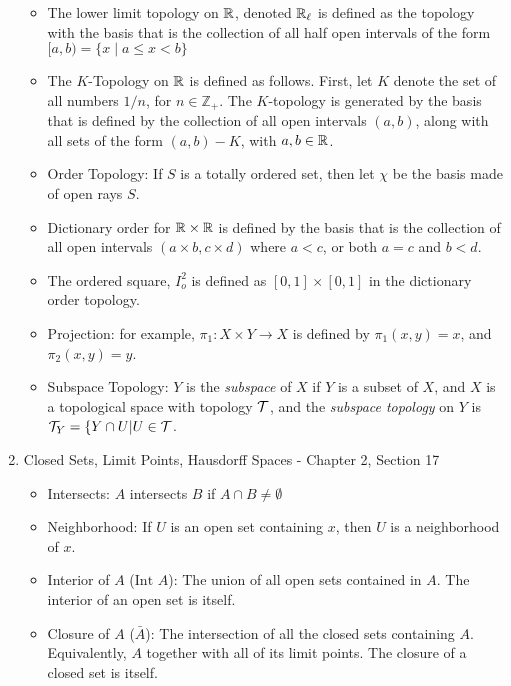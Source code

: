 \documentclass[12pt,letterpaper]{article}
\begin{document}
\begin{enumerate}
\begin{itemize}
    \item \label{dfn:lowerLimitTopology} The lower limit topology on $\mathbb{R}$, denoted $\mathbb{R}_\ell$ is defined as the topology with the basis that is the collection of all half open intervals of the form $[a,b) = \{ x\; |\; a\leq x < b \}$
    \item \label{dfn:KTopology} The $K$-Topology on $\mathbb{R}$ is defined as follows. First, let $K$ denote the set of all numbers $1/n$, for $n\in\mathbb{Z}_+$. The $K$-topology is generated by the basis that is defined by the collection of all open intervals $(a,b)$, along with all sets of the form $(a,b)-K$, with $a,b\in\mathbb{R}$.
    \item \label{dfn:orderTopology} Order Topology: If $S$ is a totally ordered set, then let $\chi$ be the basis made of open rays $S$.
    \item \label{dfn:dictionaryOrder} Dictionary order for $\mathbb{R}\times\mathbb{R}$ is defined by the basis that is the collection of all open intervals $(a\times b, c\times d)$ where $a<c$, or both $a=c$ and $b<d$.
    \item \label{dfn:orderedSquare} The ordered square, $I_o^2$ is defined as $[0,1]\times [0,1]$ in the dictionary order topology.
    \item \label{dfn:projection} Projection: for example, $\pi_1: X\times Y \rightarrow X$ is defined by $\pi_1(x,y)=x$, and $\pi_2(x,y)=y$.
    \item \label{dfn:subspace} Subspace Topology: $Y$ is the \emph{subspace} of $X$ if $Y$ is a subset of $X$, and $X$ is a topological space with topology $\mathcal{T}$, and the \emph{subspace topology} on $Y$ is $\mathcal{T}_Y=\{Y\cap U | U\in \mathcal{T}$.
  \end{itemize}
  \item \label{sec:closedSetsLimitPointsHausdorff} Closed Sets, Limit Points, Hausdorff Spaces - Chapter 2, Section 17 \begin{itemize}
    \item \label{dfn:intersects} Intersects: $A$ intersects $B$ if $A \cap B \neq \emptyset$
    \item \label{dfn:neighborhood} Neighborhood: If $U$ is an open set containing $x$, then $U$ is a neighborhood of $x$.
    \item \label{dfn:interior} Interior of $A$ ($\text{Int }A$): The union of all open sets contained in $A$. The interior of an open set is itself.
    \item \label{dfn:closure} Closure of $A$ ($\bar{A}$): The intersection of all the closed sets containing $A$. Equivalently, $A$ together with all of its limit points. The closure of a closed set is itself.

\end{itemize}
\end{enumerate}
\end{document}
